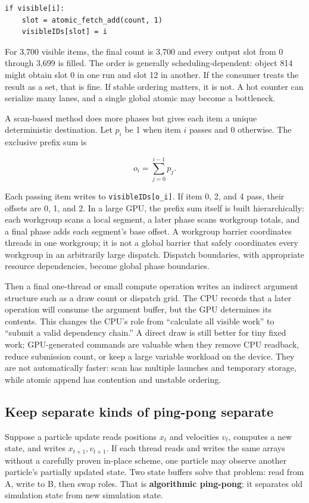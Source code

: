 \begin{verbatim}
if visible[i]:
    slot = atomic_fetch_add(count, 1)
    visibleIDs[slot] = i
\end{verbatim}

For 3,700 visible items, the final count is 3,700 and every output slot from 0 through 3,699 is filled. The order is generally scheduling-dependent: object 814 might obtain slot 0 in one run and slot 12 in another. If the consumer treats the result as a set, that is fine. If stable ordering matters, it is not. A hot counter can serialize many lanes, and a single global atomic may become a bottleneck.

A scan-based method does more phases but gives each item a unique deterministic destination. Let \(p_i\) be 1 when item \(i\) passes and 0 otherwise. The exclusive prefix sum is

\[
o_i=\sum_{j=0}^{i-1}p_j.
\]

Each passing item writes to \texttt{visibleIDs{[}o\_i{]}}. If item 0, 2, and 4 pass, their offsets are 0, 1, and 2. In a large GPU, the prefix sum itself is built hierarchically: each workgroup scans a local segment, a later phase scans workgroup totals, and a final phase adds each segment's base offset. A workgroup barrier coordinates threads in one workgroup; it is not a global barrier that safely coordinates every workgroup in an arbitrarily large dispatch. Dispatch boundaries, with appropriate resource dependencies, become global phase boundaries.

Then a final one-thread or small compute operation writes an indirect argument structure such as a draw count or dispatch grid. The CPU records that a later operation will consume the argument buffer, but the GPU determines its contents. This changes the CPU's role from ``calculate all visible work'' to ``submit a valid dependency chain.'' A direct draw is still better for tiny fixed work; GPU-generated commands are valuable when they remove CPU readback, reduce submission count, or keep a large variable workload on the device. They are not automatically faster: scan has multiple launches and temporary storage, while atomic append has contention and unstable ordering.

\subsection{Keep separate kinds of ping-pong separate}\label{keep-separate-kinds-of-ping-pong-separate}

Suppose a particle update reads positions \(x_t\) and velocities \(v_t\), computes a new state, and writes \(x_{t+1},v_{t+1}\). If each thread reads and writes the same arrays without a carefully proven in-place scheme, one particle may observe another particle's partially updated state. Two state buffers solve that problem: read from A, write to B, then swap roles. That is \textbf{algorithmic ping-pong}; it separates old simulation state from new simulation state.

